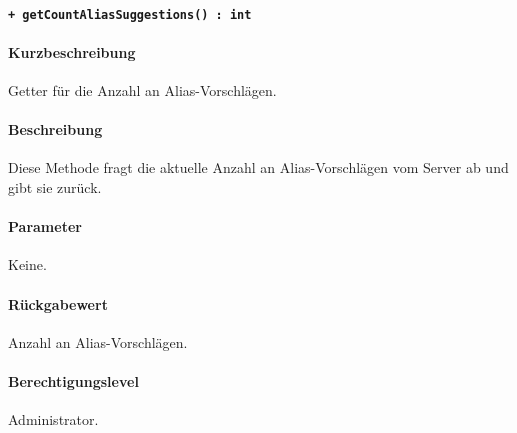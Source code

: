 \paragraph{\texttt{+ getCountAliasSuggestions() : int}}\label{AP_Backend_getCountAliasSuggestions}%
\paragraph*{Kurzbeschreibung}
Getter für die Anzahl an Alias-Vorschlägen.
\paragraph*{Beschreibung}
Diese Methode fragt die aktuelle Anzahl an Alias-Vorschlägen vom Server ab und gibt sie zurück.
\paragraph*{Parameter}
Keine.
\paragraph*{Rückgabewert}
Anzahl an Alias-Vorschlägen.
\paragraph*{Berechtigungslevel}
Administrator.